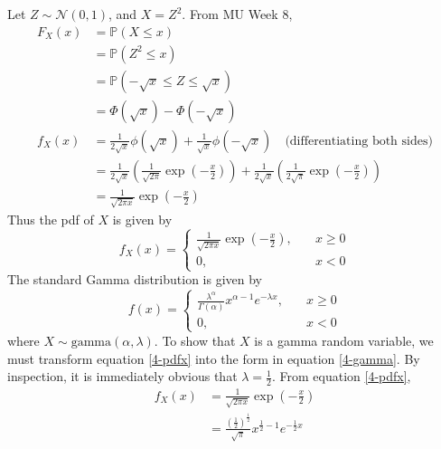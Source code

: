 \documentclass[12pt]{article}
\begin{document}
Let $Z \sim \mathcal{N}(0,1)$, and $X = Z^{2}$. From MU Week 8, \begin{align*}
    F_X (x) &= \mathbb{P}(X \leq x) \\ 
    &= \mathbb{P}(Z^{2} \leq x) \\ 
    &= \mathbb{P}(-\sqrt{x} \leq Z \leq \sqrt{x}) \\ 
    &= \Phi(\sqrt{x}) - \Phi(-\sqrt{x}) \\ 
    f_X (x) &= \frac{1}{2\sqrt{x}} \phi(\sqrt{x}) + \frac{1}{\sqrt{x}} \phi(-\sqrt{x}) \quad \text{(differentiating both sides)}\\  
    &= \frac{1}{2\sqrt{x}}\left( \frac{1}{\sqrt{2\pi}} \exp\left(-\frac{x}{2}\right)\right) + \frac{1}{2\sqrt{x}}\left( \frac{1}{2\sqrt{\pi}}\exp \left(-\frac{x}{2}\right) \right) \\ 
    &= \frac{1}{\sqrt{2\pi x}}\exp \left(-\frac{x}{2}\right)
\end{align*} Thus the pdf of $X$ is given by \begin{equation}\label{4-pdfx}
    f_X (x) = \begin{cases}
        \displaystyle\frac{1}{\sqrt{2\pi x}}\exp \left(-\frac{x}{2}\right), \quad & x \geq 0 \\ 
        0, \quad & x < 0
    \end{cases}
\end{equation} The standard Gamma distribution is given by \begin{equation}\label{4-gamma}
    f(x) = \begin{cases}
        \displaystyle \frac{\lambda^{\alpha}}{\Gamma(\alpha)}x^{\alpha-1}e^{-\lambda x}, \quad & x \geq 0 \\ 
        0, \quad & x < 0
    \end{cases}
\end{equation} where $X \sim \text{gamma}(\alpha, \lambda)$. To show that $X$ is a gamma random variable, we must transform equation \ref{4-pdfx} into the form in equation \ref{4-gamma}. By inspection, it is immediately obvious that $\lambda = \frac{1}{2}$. From equation \ref{4-pdfx}, \begin{align*}
    f_X (x) &= \frac{1}{\sqrt{2\pi x}}\exp (-\frac{x}{2}) \\ 
    &= \frac{\left( \frac{1}{2} \right)^{\frac{1}{2}}}{\sqrt{\pi}} x^{\frac{1}{2}-1} e^{-\frac{1}{2}x} \\ 
\end{align*} 
\end{document}
